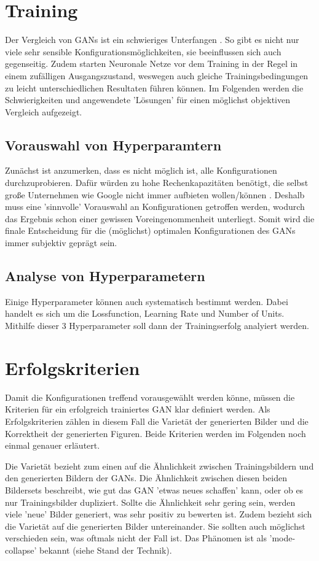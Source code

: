 \section{Training}
Der Vergleich von GANs ist ein schwieriges Unterfangen \cite{are-gans-created-equally}.
So gibt es nicht nur viele sehr sensible Konfigurationsmöglichkeiten, sie beeinflussen sich auch gegenseitig.
Zudem starten Neuronale Netze vor dem Training in der Regel in einem zufälligen Ausgangszustand, weswegen auch gleiche Trainingsbedingungen zu leicht unterschiedlichen Resultaten führen können.
Im Folgenden werden die Schwierigkeiten und angewendete 'Lösungen' für einen möglichst objektiven Vergleich aufgezeigt.

\subsection{Vorauswahl von Hyperparamtern}
Zunächst ist anzumerken, dass es nicht möglich ist, alle Konfigurationen durchzuprobieren.
Dafür würden zu hohe Rechenkapazitäten benötigt, die selbst große Unternehmen wie Google nicht immer aufbieten wollen/können \cite{are-gans-created-equally}.
Deshalb muss eine 'sinnvolle' Vorauswahl an Konfigurationen getroffen werden, wodurch das Ergebnis schon einer gewissen Voreingenommenheit unterliegt.
Somit wird die finale Entscheidung für die (möglichst) optimalen Konfigurationen des GANs immer subjektiv geprägt sein.

\subsection{Analyse von Hyperparametern}
Einige Hyperparameter können auch systematisch bestimmt werden.
Dabei handelt es sich um die Lossfunction, Learning Rate und Number of Units.
Mithilfe dieser 3 Hyperparameter soll dann der Trainingserfolg analyiert werden.

\section{Erfolgskriterien}
Damit die Konfigurationen treffend vorausgewählt werden könne, müssen die Kriterien für ein erfolgreich trainiertes GAN klar definiert werden.
Als Erfolgskriterien zählen in diesem Fall die Varietät der generierten Bilder und die Korrektheit der generierten Figuren.
Beide Kriterien werden im Folgenden noch einmal genauer erläutert.

Die Varietät bezieht zum einen auf die Ähnlichkeit zwischen Trainingsbildern und den generierten Bildern der GANs.
Die Ähnlichkeit zwischen diesen beiden Bildersets beschreibt, wie gut das GAN 'etwas neues schaffen' kann, oder ob es nur Trainingsbilder dupliziert.
Sollte die Ähnlichkeit sehr gering sein, werden viele 'neue' Bilder generiert, was sehr positiv zu bewerten ist.
Zudem bezieht sich die Varietät auf die generierten Bilder untereinander.
Sie sollten auch möglichst verschieden sein, was oftmals nicht der Fall ist.
Das Phänomen ist als 'mode-collapse' bekannt (siehe Stand der Technik). %

